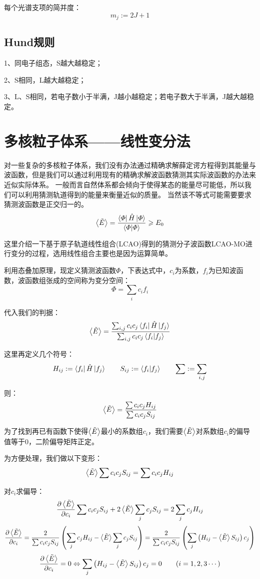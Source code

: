 每个光谱支项的简并度：
\[m_j:=2J+1\]

\subsection{Hund规则}
1、同电子组态，S越大越稳定；

2、S相同，L越大越稳定；

3、L、S相同，若电子数小于半满，J越小越稳定；若电子数大于半满，J越大越稳定。

\section{多核粒子体系——线性变分法}
对一些复杂的多核粒子体系，我们没有办法通过精确求解薛定谔方程得到其能量与波函数，但是我们可以通过利用现有的精确求解波函数猜测其实际波函数的办法来近似实际体系。
一般而言自然体系都会倾向于使得某态的能量尽可能低，所以我们可以利用猜测轨道得到的能量来衡量近似的质量。
当然该不等式可能需要要求猜测波函数是正交归一的。
\[\expval{\tilde{E}}=\frac{\bra{\varPhi}\hat{H}\ket{\varPhi}}{\bra{\varPhi}\ket{\varPhi}} \geqslant E_0\]

这里介绍一下基于原子轨道线性组合(LCAO)得到的猜测分子波函数LCAO-MO进行变分的过程，选用线性组合主要也是因为运算简单。

利用态叠加原理，现定义猜测波函数$\varPhi$，下表达式中，$c_i$为系数，$f_i$为已知波函数，波函数组张成的空间称为变分空间：
\[\varPhi=\sum_ic_if_i\]

代入我们的判据：
\[\expval{\tilde{E}}=\frac{\sum_{i,j}c_ic_j\bra{f_i}\hat{H}\ket{f_j}}{\sum_{i,j}c_ic_j\bra{f_i}\ket{f_j}}\]

这里再定义几个符号：
\[H_{ij}:=\bra{f_i}\hat{H}\ket{f_j} \qquad S_{ij}:=\bra{f_i}\ket{f_j} \qquad \sum:=\sum_{i,j}\]

则：
\[\expval{\tilde{E}}=\frac{\sum c_ic_jH_{ij}}{\sum c_ic_jS_{ij}}\]

为了找到再已有函数下使得$\expval{\tilde{E}}$最小的系数组$c_i$，我们需要$\expval{\tilde{E}}$对系数组$c_i$的偏导值等于0，二阶偏导矩阵正定。

为方便处理，我们做以下变形：
\[\expval{\tilde{E}}\sum c_ic_jS_{ij}=\sum c_ic_jH_{ij}\]

对$c_i$求偏导：
\[\frac{\partial \expval{\tilde{E}}}{\partial c_i}\sum c_ic_jS_{ij}+2\expval{\tilde{E}}\sum_j c_jS_{ij}=2\sum_j c_jH_{ij}\]
\[\frac{\partial \expval{\tilde{E}}}{\partial c_i}=\frac{2}{\sum c_ic_jS_{ij}}\left(\sum_j c_jH_{ij}-\expval{\tilde{E}}\sum_j c_jS_{ij}\right)=\frac{2}{\sum c_ic_jS_{ij}}\left(\sum_j \left (H_{ij}-\expval{\tilde{E}}S_{ij}\right )c_j\right)\]
\[\frac{\partial \expval{\tilde{E}}}{\partial c_i}=0 \Leftrightarrow \sum_j \left (H_{ij}-\expval{\tilde{E}}S_{ij}\right )c_j=0 \qquad (i=1,2,3 \cdots)\]

